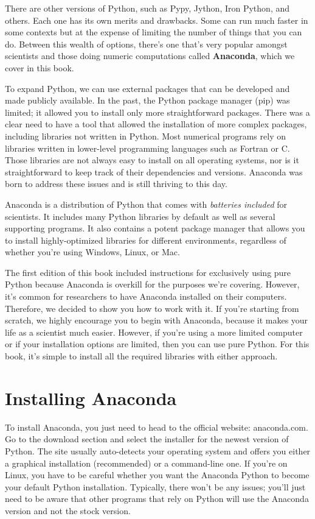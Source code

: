 There are other versions of Python, such as Pypy, Jython, Iron Python, and others. Each one has its own merits and drawbacks. Some can run much faster in some contexts but at the expense of limiting the number of things that you can do. Between this wealth of options, there's one that's very popular amongst scientists and those doing numeric computations called \textbf{Anaconda}, which we cover in this book.

To expand Python, we can use external packages that can be developed and made publicly available. In the past, the Python package manager (pip) was limited; it allowed you to install only more straightforward packages. There was a clear need to have a tool that allowed the installation of more complex packages, including libraries not written in Python. Most numerical programs rely on libraries written in lower-level programming languages such as Fortran or C. Those libraries are not always easy to install on all operating systems, nor is it straightforward to keep track of their dependencies and versions. Anaconda was born to address these issues and is still thriving to this day.

Anaconda is a distribution of Python that comes with \emph{batteries included} for scientists. It includes many Python libraries by default as well as several supporting programs. It also contains a potent package manager that allows you to install highly-optimized libraries for different environments, regardless of whether you're using Windows, Linux, or Mac.

The first edition of this book included instructions for exclusively using pure Python because Anaconda is overkill for the purposes we're covering. However, it's common for researchers to have Anaconda installed on their computers. Therefore, we decided to show you how to work with it. If you're starting from scratch, we highly encourage you to begin with Anaconda, because it makes your life as a scientist much easier. However, if you're using a more limited computer or if your installation options are limited, then you can use pure Python. For this book, it's simple to install all the required libraries with either approach.

\section{Installing Anaconda}\label{sec:installing-anaconda}
To install Anaconda, you just need to head to the official website: anaconda.com. Go to the download section and select the installer for the newest version of Python. The site usually auto-detects your operating system and offers you either a graphical installation (recommended) or a command-line one. If you're on Linux, you have to be careful whether you want the Anaconda Python to become your default Python installation. Typically, there won't be any issues; you'll just need to be aware that other programs that rely on Python will use the Anaconda version and not the stock version.

